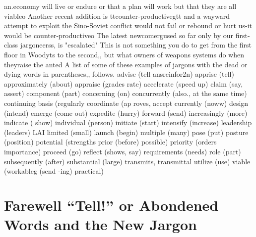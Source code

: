 \documentclass[
    oneside,
    11pt,
    draft
]{memoir}
\begin{document}
an.economy will live or endure or that a plan will work but that they are all viableo Another recent addition is ttcounter-productivegtt and a wayward attempt to exploit the Sino-Soviet conflict would not fail or rebound or hurt us-it would be counter-productiveo The latest newcomergused so far only by our first-class jargoneerss, is "escalated" This is not something you do to get from the first floor in Woodyts to the second,, but what owners of weapons systems do when theyraise the anted A list of some of these examples of jargons with the dead or dying words in parentheses,, follows. advise (tell ansreinfor2n) apprise (tell) approximately (about) appraise (grades rate) accelerate (speed up) claim (say, assert) component (part) concerning (on) concurrently (also., at the same time) continuing basis (regularly coordinate (ap roves, accept currently (noww) design (intend) emerge (come out) expedite (hurry) forward (send) increasingly (more) indicate ( show) individual (person) initiate (start) intensify (increase) leadership (leaders) LAI limited (small) launch (begin) multiple (many) pose (put) posture (position) potential (strengths prior (before) possible) priority (orders importance) proceed (go) reflect (shows, say) requirements (needs) role (part) subsequently (after) substantial (large) transmits, transmittal utilize (use) viable (workableg (send -ing) practical)

\chapter{Farewell \enquote{Tell!} or Abondened Words and the New Jargon}
\end{document}
